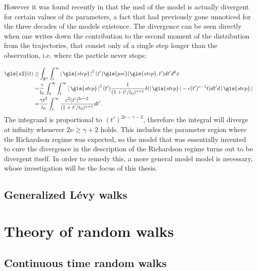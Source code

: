 


However it was found recently in \cite{radons2018} that the \gls{msd} of the model is actually divergent for certain values of its parameters, a fact that had previously gone unnoticed for the three decades of the models existence. 
The divergence can be seen directly when one writes down the contribution to the second moment of the distribution from the trajectories, that consist only of a single step longer than the observation, i.e. where the particle never stops:

\begin{align}
\gls{x2}(t) \geq& \int_{\mathbb{R}^d} \int_{t}^{\infty} \abs{\gls{step}}^{2}(t') \gls{psi}(\gls{step},t') dt' d^{d}x \\
=& \frac{\gamma}{t_0} \int_{0}^{\infty} \int_{t}^{\infty} \abs{\gls{step}}^{2}(t')  \frac{1}{(1+t'/t_0)^{\gamma+1}}  \delta(\abs{\gls{step}} - c (t')^{\nu-1}t)  dt' d\abs{\gls{step}} \\
=& \frac{\gamma t^2}{t_0}  \int_{t}^{\infty}   \frac{c^2 (t')^{2\nu-2}}{(1+t'/t_0)^{\gamma+1}}    dt'  .
\end{align}
%
The integrand is proportional to $(t')^{2\nu-\gamma-3}$, therefore the integral will diverge at infinity whenever $2 \nu \geq \gamma +2$ holds. This includes the parameter region where the Richardson regime was expected, so the model that was essentially invented to cure the divergence in the description of the Richardson regime turns out to be divergent itself. In order to remedy this, a more general model model is necessary, whose investigation will be the focus of this thesis.

\subsection{Generalized L\'evy walks}



\section{Theory of random walks}

\subsection{Continuous time random walks}

